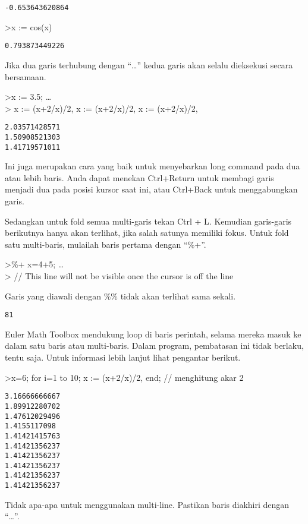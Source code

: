 \documentclass[
]{book}
\begin{document}
\begin{verbatim}
-0.653643620864
\end{verbatim}

\textgreater x := cos(x)

\begin{verbatim}
0.793873449226
\end{verbatim}

Jika dua garis terhubung dengan ``\ldots{}'' kedua garis akan selalu dieksekusi secara bersamaan.

\textgreater x := 3.5; \ldots{}\\
\textgreater{} x := (x+2/x)/2, x := (x+2/x)/2, x := (x+2/x)/2,

\begin{verbatim}
2.03571428571
1.50908521303
1.41719571011
\end{verbatim}

Ini juga merupakan cara yang baik untuk menyebarkan long command pada dua atau lebih baris. Anda dapat menekan Ctrl+Return untuk membagi garis menjadi dua pada posisi kursor saat ini, atau Ctrl+Back untuk menggabungkan garis.

Sedangkan untuk fold semua multi-garis tekan Ctrl + L. Kemudian garis-garis berikutnya hanya akan terlihat, jika salah satunya memiliki fokus. Untuk fold satu multi-baris, mulailah baris pertama dengan ``\%+''.

\textgreater\%+ x=4+5; \ldots{}\\
\textgreater{} // This line will not be visible once the cursor is off the line

Garis yang diawali dengan \%\% tidak akan terlihat sama sekali.

\begin{verbatim}
81
\end{verbatim}

Euler Math Toolbox mendukung loop di baris perintah, selama mereka masuk ke dalam satu baris atau multi-baris. Dalam program, pembatasan ini tidak berlaku, tentu saja. Untuk informasi lebih lanjut lihat pengantar berikut.

\textgreater x=6; for i=1 to 10; x := (x+2/x)/2, end; // menghitung akar 2

\begin{verbatim}
3.16666666667
1.89912280702
1.47612029496
1.4155117098
1.41421415763
1.41421356237
1.41421356237
1.41421356237
1.41421356237
1.41421356237
\end{verbatim}

Tidak apa-apa untuk menggunakan multi-line. Pastikan baris diakhiri dengan ``\ldots{}''.
\end{document}
